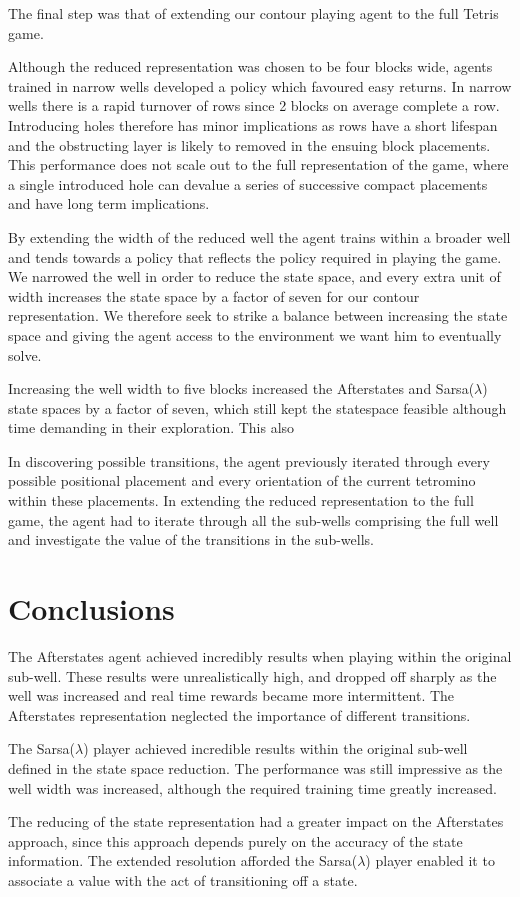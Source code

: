 \documentclass{rucsthesis}
\begin{document}
The final step was that of extending our contour playing agent to the full Tetris game.

Although the reduced representation was chosen to be four blocks wide, agents trained in narrow wells developed a policy which favoured easy returns. In narrow wells there is a rapid turnover of rows since 2 blocks on average complete a row. Introducing holes therefore has minor implications as rows have a short lifespan and the obstructing layer is likely to removed in the ensuing block placements. This performance does not scale out to the full representation of the game, where a single introduced hole can devalue a series of successive compact placements and have long term implications.

By extending the width of the reduced well the agent trains within a broader well and tends towards a policy that reflects the policy required in playing the game. We narrowed the well in order to reduce the state space, and every extra unit of width increases the state space by a factor of seven for our contour representation. We therefore seek to strike a balance between increasing the state space and giving the agent access to the environment we want him to eventually solve.

Increasing the well width to five blocks increased the Afterstates and Sarsa($\lambda$) state spaces by a factor of seven, which still kept the statespace feasible although time demanding in their exploration. This also 
 
In discovering possible transitions, the agent previously iterated through every possible positional placement and every orientation of the current tetromino within these placements. In extending the reduced representation to the full game, the agent had to iterate through all the sub-wells comprising the full well and investigate the value of the transitions in the sub-wells.


\chapter{Conclusions}

The Afterstates agent achieved incredibly results when playing within the original sub-well. These results were unrealistically high, and dropped off sharply as the well was increased and real time rewards became more intermittent. The Afterstates representation neglected the importance of different transitions.

The Sarsa($\lambda$) player achieved incredible results within the original sub-well defined in the state space reduction. The performance was still impressive as the well width was increased, although the required training time greatly increased.

The reducing of the state representation had a greater impact on the Afterstates approach, since this approach depends purely on the accuracy of the state information. The extended resolution afforded the Sarsa($\lambda$) player enabled it to associate a value with the act of transitioning off a state. 


\end{document}
